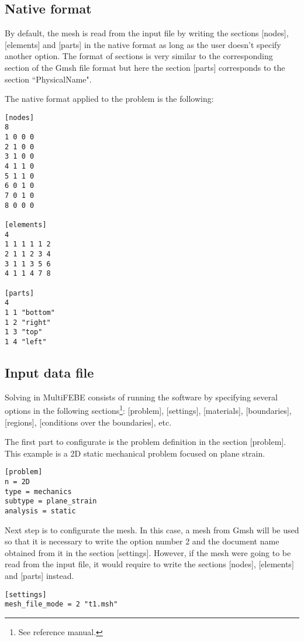 \documentclass[A4]{article}
\begin{document}
\subsection{Native format}

By default, the mesh is read from the input file by writing the sections [nodes], [elements] and [parts] in the native format as long as the user doesn't specify another option. The format of sections is very similar to the corresponding section of the Gmsh file format but here the section [parts] corresponds to the section ``PhysicalName".

The native format applied to the problem is the following:

\begin{Verbatim}
[nodes]
8
1 0 0 0
2 1 0 0
3 1 0 0
4 1 1 0
5 1 1 0
6 0 1 0
7 0 1 0
8 0 0 0

[elements]
4
1 1 1 1 1 2
2 1 1 2 3 4
3 1 1 3 5 6
4 1 1 4 7 8

[parts]
4
1 1 "bottom"
1 2 "right"
1 3 "top"
1 4 "left"
\end{Verbatim}

\subsection{Input data file}

Solving in MultiFEBE consists of running the software by specifying several options in the following sections\footnote{See reference manual.}: [problem], [settings], [materials], [boundaries], [regions], [conditions over the boundaries], etc.

The first part to configurate is the problem definition in the section [problem]. This example is a 2D static mechanical problem focused on plane strain.  

\begin{Verbatim}	
[problem]
n = 2D
type = mechanics
subtype = plane_strain
analysis = static
\end{Verbatim}

Next step is to configurate the mesh. In this case, a mesh from Gmsh will be used so that it is necessary to write the option number 2 and the document name obtained from it in the section [settings]. However, if the mesh were going to be read from the input file, it would require to write the sections [nodes], [elements] and [parts] instead.

\begin{Verbatim}	
[settings]
mesh_file_mode = 2 "t1.msh"
\end{Verbatim}
\end{document}
